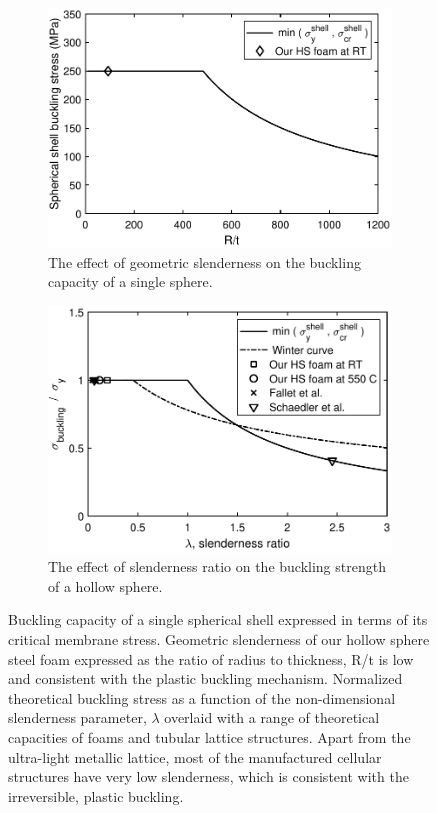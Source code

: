 \documentclass[review]{elsarticle}
\begin{document}
\begin{figure}[htp]
	\centering
	\begin{subfigure}{0.95\textwidth}
		\centering
		\includegraphics[width=0.65\linewidth]
		{Tex-Figures/Fig12a_Buckling_b_t.pdf}
		\caption{The effect of geometric slenderness on the buckling capacity of a single sphere.}
		\label{fig12:sub1}
	\end{subfigure}

	\par\bigskip %

	\begin{subfigure}{0.95\textwidth}
		\centering
		\includegraphics[width=0.65\linewidth]
		{Tex-Figures/Fig12b_Buckling_lambda.pdf}
		\caption{The effect of slenderness ratio on the buckling strength of a hollow sphere.}
		\label{fig12:sub2}
	\end{subfigure}
	\caption{Buckling capacity of a single spherical shell expressed in terms of its critical membrane stress. Geometric slenderness of our hollow sphere steel foam expressed as the ratio of radius to thickness, R/t is low and consistent with the plastic buckling mechanism. Normalized theoretical buckling stress as a function of the non-dimensional slenderness parameter, $\lambda$ overlaid with a range of theoretical capacities of foams and tubular lattice structures. Apart from the ultra-light metallic lattice, most of the manufactured cellular structures have very low slenderness, which is consistent with the irreversible, plastic buckling.}
\end{figure}
\end{document}
